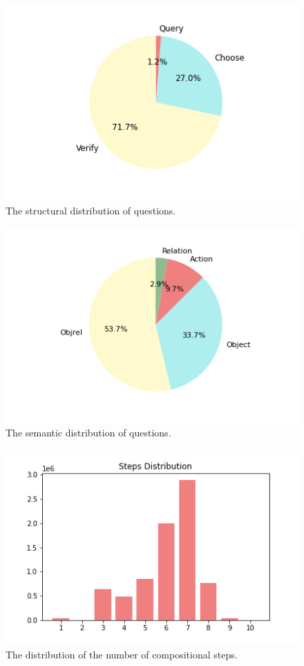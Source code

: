 \begin{figure}[t]
\begin{center}
\includegraphics[width=0.8\linewidth]{Figures/struct_dist.png}
\caption{The structural distribution of questions.}
\end{center}
\label{structural}
\end{figure}


\begin{figure}[t]
\begin{center}
\includegraphics[width=0.8\linewidth]{Figures/sem_dist.png}
\end{center}
   \caption{The semantic distribution of questions.}
\label{semantics}
\end{figure}


\begin{figure}[t]
\begin{center}
\includegraphics[width=0.8\linewidth]{Figures/steps_dist.png}
\end{center}
   \caption{The distribution of the number of compositional steps.}
\label{steps}
\end{figure}



